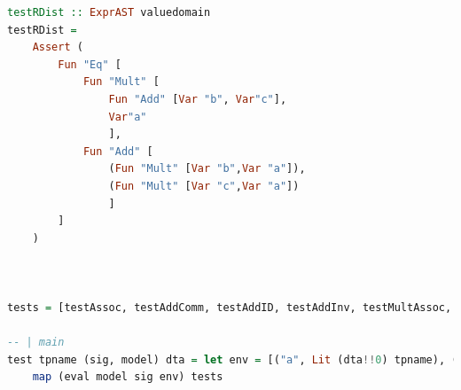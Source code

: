 \documentclass[tikz, border=5mm]{article}
\begin{document}
\begin{lstlisting}[language=Haskell]
testRDist :: ExprAST valuedomain
testRDist =  
    Assert ( 
        Fun "Eq" [
            Fun "Mult" [
                Fun "Add" [Var "b", Var"c"], 
                Var"a"
                ], 
            Fun "Add" [
                (Fun "Mult" [Var "b",Var "a"]),
                (Fun "Mult" [Var "c",Var "a"])
                ] 
        ]
    )



tests = [testAssoc, testAddComm, testAddID, testAddInv, testMultAssoc, testMultID, testLDist, testRDist]

-- | main
test tpname (sig, model) dta = let env = [("a", Lit (dta!!0) tpname), ("b", Lit (dta!!1) tpname), ("c", Lit (dta!!2) tpname), ("multConst", Lit (dta!!3) tpname), ("addConst", Lit (dta!!2) tpname)] in
    map (eval model sig env) tests
    \end{lstlisting}
\end{document}
